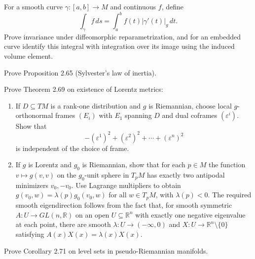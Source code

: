 \begin{exercise}\label{prob:arc-length-integral}
For a smooth curve $\gamma:[a,b]\to M$ and continuous $f$, define
\[
\int_\gamma f\,ds=\int_a^bf(t)|\gamma'(t)|_g\,dt.
\]
Prove invariance under diffeomorphic reparametrization, and for an embedded curve identify this integral with integration over its image using the induced volume element.
\end{exercise}

\begin{exercise}\label{prob:sylvesters-law-inertia}
\leanok
{}
Prove Proposition 2.65 (Sylvester's law of inertia).
\end{exercise}

\begin{exercise}\label{prob:lorentz-metric-existence}
\leanok
{}
Prove Theorem 2.69 on existence of Lorentz metrics:

\begin{enumerate}
\item[(a)] If $D \subseteq TM$ is a rank-one distribution and $g$ is Riemannian, choose local $g$-orthonormal frames $(E_i)$ with $E_1$ spanning $D$ and dual coframes $(\varepsilon^i)$. Show that
\[
-(\varepsilon^1)^2+(\varepsilon^2)^2+\cdots+(\varepsilon^n)^2
\]
is independent of the choice of frame.

\item[(b)] If $g$ is Lorentz and $g_0$ is Riemannian, show that for each $p\in M$ the function $v\mapsto g(v,v)$ on the $g_0$-unit sphere in $T_pM$ has exactly two antipodal minimizers $v_0,-v_0$. Use Lagrange multipliers to obtain $g(v_0,w)=\lambda(p)g_0(v_0,w)$ for all $w\in T_pM$, with $\lambda(p)<0$. The required smooth eigendirection follows from the fact that, for smooth symmetric $A:U\to GL(n,\mathbb R)$ on an open $U\subseteq\mathbb R^n$ with exactly one negative eigenvalue at each point, there are smooth $\lambda:U\to(-\infty,0)$ and $X:U\to\mathbb R^n\setminus\{0\}$ satisfying $A(x)X(x)=\lambda(x)X(x)$.
\end{enumerate}
\end{exercise}

\begin{exercise}\label{prob:level-sets-pseudo-riemannian}
\leanok
{}
Prove Corollary 2.71 on level sets in pseudo-Riemannian manifolds.
\end{exercise}
